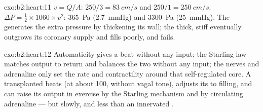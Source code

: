 \begin{solution}{exo:b2:heart:11}
$v = Q/A$: $250/3 = \qty{83}{cm/s}$ and $250/1 = \qty{250}{cm/s}$.
$\Delta P = \tfrac12\times 1060\times v^{2}$: \qty{365}{Pa}
(\qty{2.7}{mmHg}) and \qty{3300}{Pa} (\qty{25}{mmHg}). The 
generates the extra pressure by thickening its wall; the thick,
stiff  eventually outgrows its coronary supply and fills
poorly, and fails.
\end{solution}

\begin{solution}{exo:b2:heart:12}
Automaticity gives a beat without any input; the Starling law
matches output to return and balances the two  without
any input; the nerves and adrenaline only set the rate and
contractility around that self-regulated core. A transplanted
 beats (at about 100, without vagal tone), adjusts its  to filling, and can raise its output in exercise by the
Starling mechanism and by circulating adrenaline --- but slowly,
and less than an innervated .
\end{solution}

